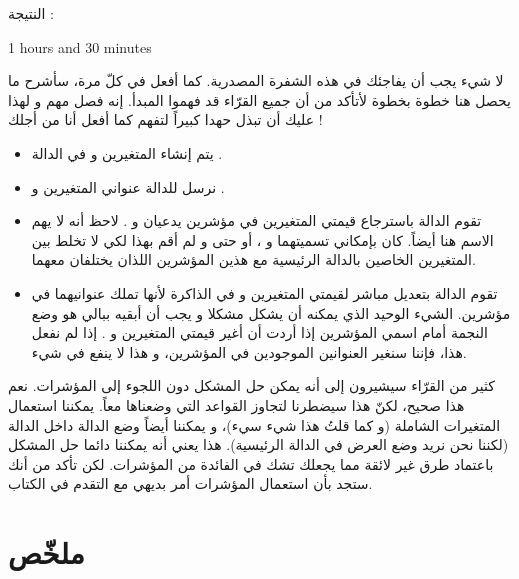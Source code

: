 النتيجة :

\begin{Console}
1 hours and 30 minutes
\end{Console}

لا شيء يجب أن يفاجئك في هذه الشفرة المصدرية. كما أفعل في كلّ مرة، سأشرح ما يحصل هنا خطوة بخطوة لأتأكد من أن جميع القرّاء قد فهموا المبدأ. إنه فصل مهم و لهذا عليك أن تبذل حهدا كبيراً لتفهم كما أفعل أنا من أجلك !

\begin{itemize}
	\item يتم إنشاء المتغيرين
و
في الدالة
.
	\item نرسل للدالة
عنواني المتغيرين
و
.
	\item تقوم الدالة
باسترجاع قيمتي المتغيرين في مؤشرين يدعيان
و
.
لاحظ أنه لا يهم الاسم هنا أيضاً. كان بإمكاني تسميتهما
و
،
أو حتى
و
لم أقم بهذا لكي لا تخلط بين المتغيرين الخاصين بالدالة الرئيسية مع هذين المؤشرين اللذان يختلفان معهما.
	\item تقوم الدالة
بتعديل مباشر لقيمتي المتغيرين
و
في الذاكرة لأنها تملك عنوانيهما في مؤشرين. الشيء الوحيد الذي يمكنه أن يشكل مشكلا و يجب أن أبقيه ببالي هو وضع النجمة أمام اسمي المؤشرين إذا أردت أن أغير قيمتي المتغيرين
و
.
إذا لم نفعل هذا، فإننا سنغير العنوانين الموجودين في المؤشرين، و هذا لا ينفع في شيء.
\end{itemize}

\begin{information}
	كثير من القرّاء سيشيرون إلى أنه يمكن حل المشكل دون اللجوء إلى المؤشرات. نعم هذا صحيح، لكنّ هذا سيضطرنا لتجاوز القواعد التي وضعناها معاً. يمكننا استعمال المتغيرات الشاملة (و كما قلتُ هذا شيء سيء)، و يمكننا أيضاً وضع الدالة
داخل الدالة
(لكننا نحن نريد وضع العرض في الدالة الرئيسية). هذا يعني أنه يمكننا دائما حل المشكل باعتماد طرق غير لائقة مما يجعلك تشك في الفائدة من المؤشرات. لكن تأكد من أنك ستجد بأن استعمال المؤشرات أمر بديهي مع التقدم في الكتاب.
\end{information}

\section*{ملخّص}

